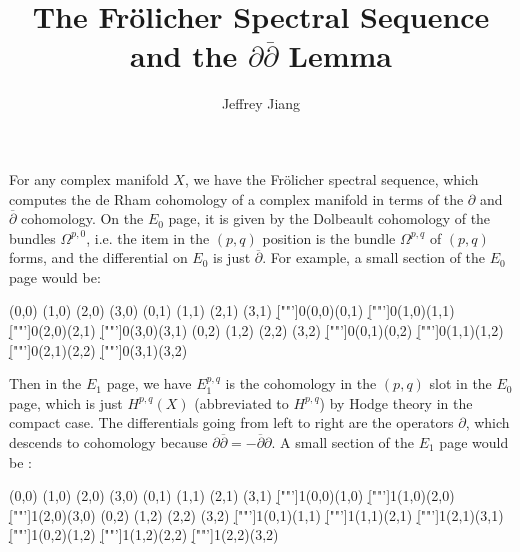 \documentclass[psamsfonts, 12pt]{amsart}
\theoremstyle{definition}
\theoremstyle{remark}
\newcommand{\dbar}{\overline{\partial}}
\begin{document}
%
\author{Jeffrey Jiang}
%
\title{The Fr\"olicher Spectral Sequence and the $\partial\dbar$ Lemma}
%
\setcounter{section}{1}
%
\maketitle
%
For any complex manifold $X$, we have the Fr\"olicher spectral sequence, which
computes the de Rham cohomology of a complex manifold in terms of the
$\partial$ and $\dbar$ cohomology. On the $E_0$ page, it is given
by the Dolbeault cohomology of the bundles $\Omega^{p,0}$, i.e. the item
in the $(p,q)$ position is the bundle $\Omega^{p,q}$ of $(p,q)$ forms, and
the differential on $E_0$ is just $\dbar$. For example, a small section of
the $E_0$ page would be: \\
%
\begin{sseqdata}[name=Frolicher0, classes = {draw = none}, yscale=2, xscale=2]
\class["\Omega^{0,0}"](0,0)
\class["\Omega^{1,0}"](1,0)
\class["\Omega^{2,0}"](2,0)
\class["\Omega^{3,0}"](3,0)
\class["\Omega^{0,1}"](0,1)
%
\class["\Omega^{1,1}"](1,1)
\class["\Omega^{2,1}"](2,1)
\class["\Omega^{3,1}"](3,1)
\d["\dbar"']0(0,0)(0,1)
\d["\dbar"']0(1,0)(1,1)
\d["\dbar"']0(2,0)(2,1)
\d["\dbar"']0(3,0)(3,1)
%
\class["\Omega^{0,2}"](0,2)
\class["\Omega^{1,2}"](1,2)
\class["\Omega^{2,2}"](2,2)
\class["\Omega^{3,2}"](3,2)
\d["\dbar"']0(0,1)(0,2)
\d["\dbar"']0(1,1)(1,2)
\d["\dbar"']0(2,1)(2,2)
\d["\dbar"']0(3,1)(3,2)
\end{sseqdata}
\begin{center}
\printpage[name=Frolicher0, page = 0]
\end{center}
%
Then in the $E_1$ page, we have $E_1^{p,q}$ is the cohomology in the $(p,q)$ slot
in the $E_0$ page, which is just $H^{p,q}(X)$ (abbreviated to $H^{p,q}$) by Hodge
theory in the compact case. The differentials going from left to right are the
operators $\partial$, which descends to cohomology because
$\partial\dbar = -\dbar\partial$. A small section of the $E_1$ page would be : \\
%
\begin{sseqdata}[name=Frolicher1, classes = {draw = none}, yscale=2, xscale=2]
\class["H^{0,0}"](0,0)
\class["H^{1,0}"](1,0)
\class["H^{2,0}"](2,0)
\class["H^{3,0}"](3,0)
\class["H^{0,1}"](0,1)
%
\class["H^{1,1}"](1,1)
\class["H^{2,1}"](2,1)
\class["H^{3,1}"](3,1)
\d["\partial"']1(0,0)(1,0)
\d["\partial"']1(1,0)(2,0)
\d["\partial"']1(2,0)(3,0)
%
\class["H^{0,2}"](0,2)
\class["H^{1,2}"](1,2)
\class["H^{2,2}"](2,2)
\class["H^{3,2}"](3,2)
\d["\partial"']1(0,1)(1,1)
\d["\partial"']1(1,1)(2,1)
\d["\partial"']1(2,1)(3,1)
%
\d["\partial"']1(0,2)(1,2)
\d["\partial"']1(1,2)(2,2)
\d["\partial"']1(2,2)(3,2)
\end{sseqdata}
\end{document}
